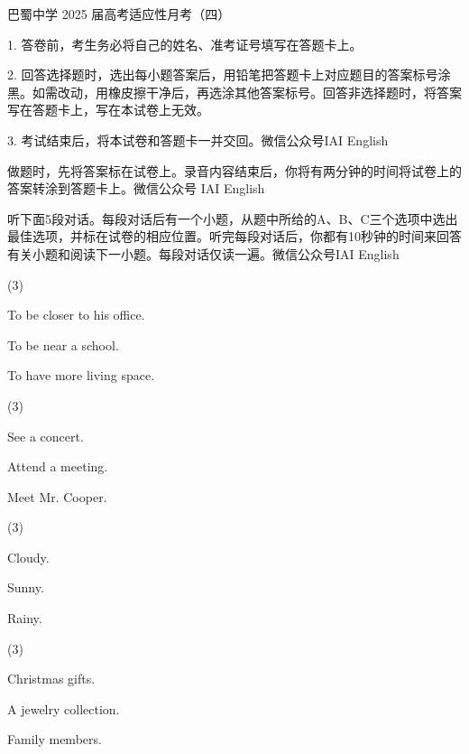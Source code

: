 \documentclass{英语试卷}
\begin{document}
\par 巴蜀中学 2025 届高考适应性月考（四）\par
\begin{notice}
\par 1. 答卷前，考生务必将自己的姓名、准考证号填写在答题卡上。\par
\par 2. 回答选择题时，选出每小题答案后，用铅笔把答题卡上对应题目的答案标号涂黑。如需改动，用橡皮擦干净后，再选涂其他答案标号。回答非选择题时，将答案写在答题卡上，写在本试卷上无效。\par
\par 3. 考试结束后，将本试卷和答题卡一并交回。微信公众号IAI English\par
\end{notice}
\par 做题时，先将答案标在试卷上。录音内容结束后，你将有两分钟的时间将试卷上的答案转涂到答题卡上。微信公众号 IAI English\par
{}
\par 听下面5段对话。每段对话后有一个小题，从题中所给的A、B、C三个选项中选出最佳选项，并标在试卷的相应位置。听完每段对话后，你都有10秒钟的时间来回答有关小题和阅读下一小题。每段对话仅读一遍。微信公众号IAI English\par
{}
\begin{choices}(3)
  \item To be closer to his office.
  \item To be near a school.
  \item To have more living space.
\end{choices}
\begin{choices}(3)
  \item See a concert.
  \item Attend a meeting.
  \item Meet Mr. Cooper.
\end{choices}
\begin{choices}(3)
  \item Cloudy.
  \item Sunny.
  \item Rainy.
\end{choices}
\begin{choices}(3)
  \item Christmas gifts.
  \item A jewelry collection.
  \item Family members.
\end{choices}
\end{document}
